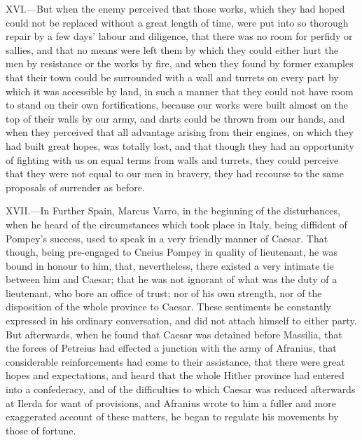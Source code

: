 XVI.—But when the enemy perceived that those works, which they had
hoped could not be replaced without a great length of time, were put
into so thorough repair by a few days' labour and diligence, that there
was no room for perfidy or sallies, and that no means were left them by
which they could either hurt the men by resistance or the works by fire,
and when they found by former examples that their town could be
surrounded with a wall and turrets on every part by which it was
accessible by land, in such a manner that they could not have room to
stand on their own fortifications, because our works were built almost
on the top of their walls by our army, and darts could be thrown from
our hands, and when they perceived that all advantage arising from their
engines, on which they had built great hopes, was totally lost, and that
though they had an opportunity of fighting with us on equal terms from
walls and turrets, they could perceive that they were not equal to our
men in bravery, they had recourse to the same proposals of surrender as
before.

XVII.—In Further Spain, Marcus Varro, in the beginning of the
disturbances, when he heard of the circumstances which took place in
Italy, being diffident of Pompey's success, used to speak in a very
friendly manner of Caesar. That though, being pre-engaged to Cneius
Pompey in quality of lieutenant, he was bound in honour to him, that,
nevertheless, there existed a very intimate tie between him and Caesar;
that he was not ignorant of what was the duty of a lieutenant, who bore
an office of trust; nor of his own strength, nor of the disposition of
the whole province to Caesar. These sentiments he constantly expressed
in his ordinary conversation, and did not attach himself to either
party. But afterwards, when he found that Caesar was detained before
Massilia, that the forces of Petreius had effected a junction with the
army of Afranius, that considerable reinforcements had come to their
assistance, that there were great hopes and expectations, and heard that
the whole Hither province had entered into a confederacy, and of the
difficulties to which Caesar was reduced afterwards at Ilerda for want
of provisions, and Afranius wrote to him a fuller and more exaggerated
account of these matters, he began to regulate his movements by those of
fortune.

